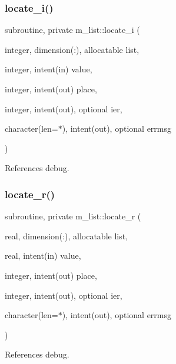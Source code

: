 \subsubsection{\texorpdfstring{locate\+\_\+i()}{locate\_i()}}
{\footnotesize\ttfamily subroutine, private m\+\_\+list\+::locate\+\_\+i (\begin{DoxyParamCaption}\item[{integer, dimension(\+:), allocatable}]{list,  }\item[{integer, intent(in)}]{value,  }\item[{integer, intent(out)}]{place,  }\item[{integer, intent(out), optional}]{ier,  }\item[{character(len=$\ast$), intent(out), optional}]{errmsg }\end{DoxyParamCaption})\hspace{0.3cm}{\ttfamily [private]}}



References debug.

\mbox{\label{namespacem__list_a533a0e5b16558efb391913e881a57040}} 
\subsubsection{\texorpdfstring{locate\+\_\+r()}{locate\_r()}}
{\footnotesize\ttfamily subroutine, private m\+\_\+list\+::locate\+\_\+r (\begin{DoxyParamCaption}\item[{real, dimension(\+:), allocatable}]{list,  }\item[{real, intent(in)}]{value,  }\item[{integer, intent(out)}]{place,  }\item[{integer, intent(out), optional}]{ier,  }\item[{character(len=$\ast$), intent(out), optional}]{errmsg }\end{DoxyParamCaption})\hspace{0.3cm}{\ttfamily [private]}}



References debug.

\mbox{\label{namespacem__list_a216c9ec18769ee63a769cc25bc273022}} 

